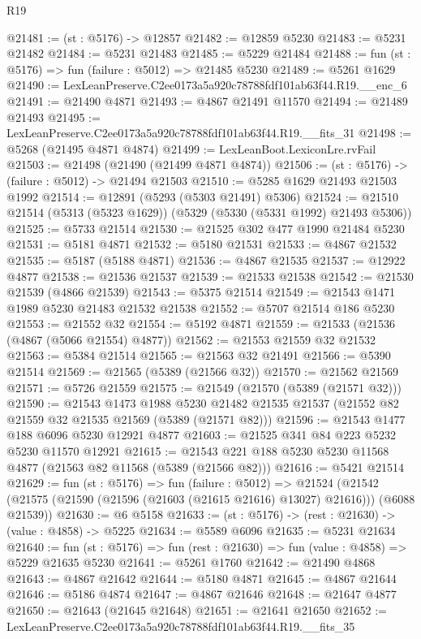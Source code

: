 \begin{lexlean}{R19}
\begin{coremodule}
@21481 := (st : @5176) -> @12857
@21482 := @12859 @5230
@21483 := @5231 @21482
@21484 := @5231 @21483
@21485 := @5229 @21484
@21488 := fun (st : @5176) => fun (failure : @5012) => @21485 @5230
@21489 := @5261 @1629
@21490 := LexLeanPreserve.C2ee0173a5a920c78788fdf101ab63f44.R19.__enc_6
@21491 := @21490 @4871
@21493 := @4867 @21491 @11570
@21494 := @21489 @21493
@21495 := LexLeanPreserve.C2ee0173a5a920c78788fdf101ab63f44.R19.__fits_31
@21498 := @5268 (@21495 @4871 @4874)
@21499 := LexLeanBoot.LexiconLre.rvFail
@21503 := @21498 (@21490 (@21499 @4871 @4874))
@21506 := (st : @5176) -> (failure : @5012) -> @21494 @21503
@21510 := @5285 @1629 @21493 @21503 @1992
@21514 := @12891 (@5293 (@5303 @21491) @5306)
@21524 := @21510 @21514 (@5313 (@5323 @1629)) (@5329 (@5330 (@5331 @1992) @21493 @5306))
@21525 := @5733 @21514
@21530 := @21525 @302 @477 @1990 @21484 @5230
@21531 := @5181 @4871
@21532 := @5180 @21531
@21533 := @4867 @21532
@21535 := @5187 (@5188 @4871)
@21536 := @4867 @21535
@21537 := @12922 @4877
@21538 := @21536 @21537
@21539 := @21533 @21538
@21542 := @21530 @21539 (@4866 @21539)
@21543 := @5375 @21514
@21549 := @21543 @1471 @1989 @5230 @21483 @21532 @21538
@21552 := @5707 @21514 @186 @5230
@21553 := @21552 @32
@21554 := @5192 @4871
@21559 := @21533 (@21536 (@4867 (@5066 @21554) @4877))
@21562 := @21553 @21559 @32 @21532
@21563 := @5384 @21514
@21565 := @21563 @32 @21491
@21566 := @5390 @21514
@21569 := @21565 (@5389 (@21566 @32))
@21570 := @21562 @21569
@21571 := @5726 @21559
@21575 := @21549 (@21570 (@5389 (@21571 @32)))
@21590 := @21543
    @1473
    @1988
    @5230
    @21482
    @21535
    @21537
    (@21552 @82 @21559 @32 @21535 @21569 (@5389 (@21571 @82)))
@21596 := @21543 @1477 @188 @6096 @5230 @12921 @4877
@21603 := @21525 @341 @84 @223 @5232 @5230 @11570 @12921
@21615 := @21543 @221 @188 @5230 @5230 @11568 @4877 (@21563 @82 @11568 (@5389 (@21566 @82)))
@21616 := @5421 @21514
@21629 := fun (st : @5176) =>
  fun (failure : @5012) =>
  @21524 (@21542 (@21575 (@21590 (@21596 (@21603 (@21615 @21616) @13027) @21616))) (@6088 @21539))
@21630 := @6 @5158
@21633 := (st : @5176) -> (rest : @21630) -> (value : @4858) -> @5225
@21634 := @5589 @6096
@21635 := @5231 @21634
@21640 := fun (st : @5176) => fun (rest : @21630) => fun (value : @4858) => @5229 @21635 @5230
@21641 := @5261 @1760
@21642 := @21490 @4868
@21643 := @4867 @21642
@21644 := @5180 @4871
@21645 := @4867 @21644
@21646 := @5186 @4874
@21647 := @4867 @21646
@21648 := @21647 @4877
@21650 := @21643 (@21645 @21648)
@21651 := @21641 @21650
@21652 := LexLeanPreserve.C2ee0173a5a920c78788fdf101ab63f44.R19.__fits_35

\end{coremodule}
\end{lexlean}
